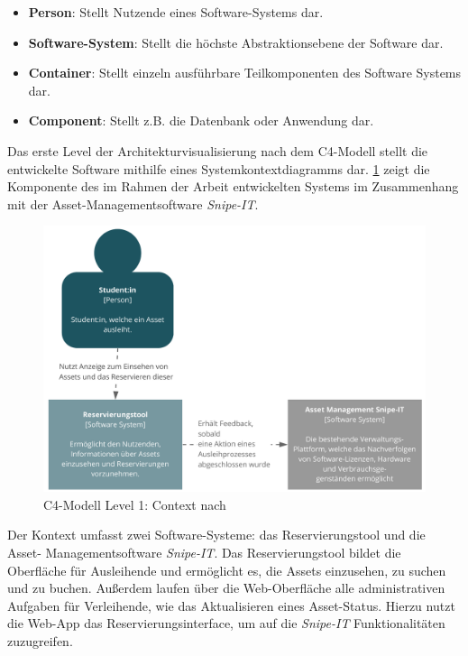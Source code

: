 \begin{itemize}
    \item \textbf{Person}: Stellt Nutzende eines Software-Systems dar.
    \item \textbf{Software-System}: Stellt die höchste Abstraktionsebene der
          Software dar.
    \item \textbf{Container}: Stellt einzeln ausführbare Teilkomponenten des
          Software Systems dar.
    \item \textbf{Component}: Stellt z.B. die Datenbank oder Anwendung dar.
\end{itemize}

{\sffamily\color{maincolor}{Level 1: Context}}

Das erste Level der Architekturvisualisierung nach dem C4-Modell stellt die
entwickelte Software mithilfe eines Systemkontextdiagramms dar. \ref{fig:level1}
zeigt die Komponente des im Rahmen der Arbeit entwickelten Systems im
Zusammenhang mit der Asset-Managementsoftware \textit{Snipe-IT}.

\begin{figure}[h]
    \centering
    \includegraphics[scale=0.4]{Bilder/C4_1.pdf}
    \caption[C4-Modell Level 1: Context]{C4-Modell Level 1: Context nach
        }
    \label{fig:level1}
\end{figure}

Der Kontext umfasst zwei Software-Systeme: das Reservierungstool und die Asset- Managementsoftware
\textit{Snipe-IT}. Das Reservierungstool bildet die Oberfläche für Ausleihende und ermöglicht es, die Assets
einzusehen, zu suchen und zu buchen. Außerdem laufen über die Web-Oberfläche alle administrativen
Aufgaben für Verleihende, wie das Aktualisieren eines Asset-Status. Hierzu nutzt die Web-App das
Reservierungsinterface, um auf die \textit{Snipe-IT} Funktionalitäten zuzugreifen.

